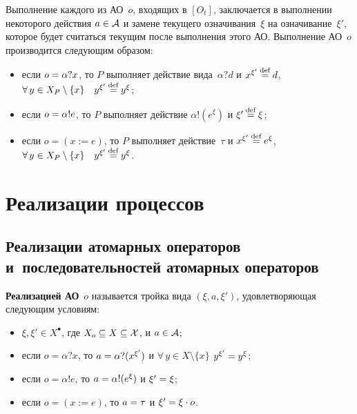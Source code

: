 \begin{multicols}{2}
Выполнение каждого из АО~$o$, входящих в $[O_t]$,
заключается в выполнении некоторого действия $a\hm\in {\cal A}$
и замене текущего означивания~$\xi$ на  означивание~$\xi'$,
которое будет считаться текущим после выполнения  этого АО.
Выполнение АО~$o$ производится следующим образом:
\begin{itemize}
\item если $o \hm= \alpha?x$, то $P$ выполняет действие вида~$\alpha?d$
и $x^{\xi'} \mathbin{{\mathop{=}\limits^{\mathrm{def}}}} d$, $\forall\,y \hm\in X_P \setminus \{x\}\quad
y^{\xi'} \eam y^{\xi}$;
\item если $o \hm= \alpha!e$, то $P$  выполняет действие
$\alpha!(e^{\xi})$ и $\xi'\mathbin{{\mathop{=}\limits^{\mathrm{def}}}} \xi$;
\item если $o =  (x := e)$, то $P$  выполняет действие~$\tau$
и $x^{\xi'} \mathbin{{\mathop{=}\limits^{\mathrm{def}}}} e^{\xi}$, $\forall\,y \hm\in X_P \setminus \{x\}\quad
y^{\xi'} \eam y^{\xi}$.
\end{itemize}

\section{Реализации процессов}

\subsection{Реализации атомарных операторов
и~последовательностей атомарных операторов}

{\bf Реализацией АО}~$o$ называется  тройка вида
$(\xi, a, \xi')$, удовлетворяющая следующим
условиям:
\begin{itemize}
\item $\xi,\xi' \in X^\bullet$,
где $X_o\subseteq  X\subseteq {\cal X}$, и $a\hm\in {\cal A}$;
\item если $o=\alpha?x$, то $a\hm=\alpha?(x^{\xi'})$ и
$\forall\,y\in X\setminus \{x\}$
$y^{\xi'}\hm=y^\xi$;
\item если $o=\alpha!e$, то $a\hm=\alpha!(e^\xi)$ и $\xi'\hm=\xi$;
\item если $o=(x:=e)$, то $a\hm=\tau$ и
$\xi'\hm=\deyc{\xi}{o}$.
\end{itemize}


\end{multicols}
